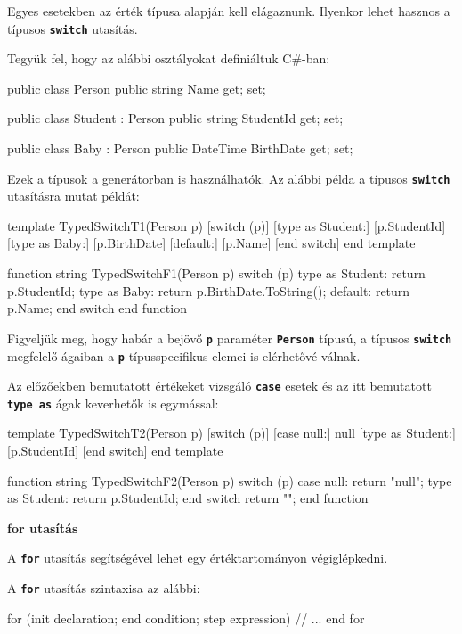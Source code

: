\documentclass[12pt, a4paper]{report}
\newcommand{\ff}[1]{\textbf{\texttt{#1}}}
\newcommand{\bb}[1]{\textbf{#1}}
\begin{document}
Egyes esetekben az érték típusa alapján kell elágaznunk. Ilyenkor lehet hasznos a típusos \ff{switch} utasítás.

Tegyük fel, hogy az alábbi osztályokat definiáltuk C\#-ban:

\begin{csharpcode}
public class Person
{
	public string Name { get; set; }
}

public class Student : Person
{
	public string StudentId { get; set; }
}

public class Baby : Person
{
	public DateTime BirthDate { get; set; }
}
\end{csharpcode}

Ezek a típusok a generátorban is használhatók. Az alábbi példa a típusos \ff{switch} utasításra mutat példát:

\begin{mgencode}
template TypedSwitchT1(Person p)
  [switch (p)]
  [type as Student:]
[p.StudentId]
  [type as Baby:]
[p.BirthDate]
  [default:]
[p.Name]
  [end switch]
end template

function string TypedSwitchF1(Person p)
  switch (p)
  type as Student: return p.StudentId;
  type as Baby: return p.BirthDate.ToString();
  default: return p.Name;
  end switch
end function
\end{mgencode}

Figyeljük meg, hogy habár a bejövő \ff{p} paraméter \ff{Person} típusú, a típusos \ff{switch} megfelelő ágaiban a \ff{p} típusspecifikus elemei is elérhetővé válnak.

Az előzőekben bemutatott értékeket vizsgáló \ff{case} esetek és az itt bemutatott \ff{type as} ágak keverhetők is egymással:

\begin{mgencode}
template TypedSwitchT2(Person p)
  [switch (p)]
  [case null:]
null
  [type as Student:]
[p.StudentId]
  [end switch]
end template

function string TypedSwitchF2(Person p)
  switch (p)
  case null: return "null";
  type as Student: return p.StudentId;
  end switch
return "";
end function
\end{mgencode}

\bb{for utasítás}

A \ff{for} utasítás segítségével lehet egy értéktartományon végiglépkedni.

A \ff{for} utasítás szintaxisa az alábbi:

\begin{mgencode}
for (init declaration; end condition; step expression)
// ...
end for
\end{mgencode}
\end{document}
